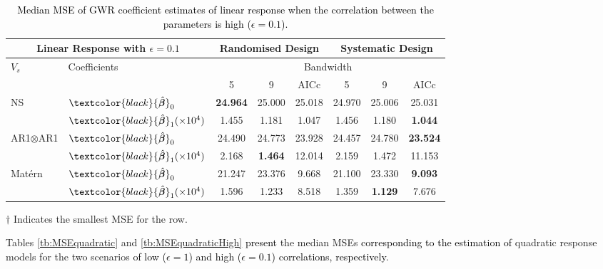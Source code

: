 \documentclass[a4paper]{article} 	%
\newcommand{\Matern}{Mat\'ern }
\newcommand{\revision}[1]{\textcolor{black}{#1}}
\newcommand{\zc}[1]{\textcolor{black}{#1}}
\begin{document}
\begin{table}[!htp]
	\centering
\begin{threeparttable}
\caption{\zc{Median MSE of GWR coefficient estimates of linear response when the correlation between the parameters is high ($\epsilon=0.1$).}}\label{tb:MSElinearHigh}
\begin{tabular}{ll|ccc|ccc}
\toprule
\multicolumn{2}{c}{Linear Response with $\epsilon=0.1$} & \multicolumn{3}{c}{Randomised Design} & \multicolumn{3}{c}{Systematic Design} \\ \midrule
\multirow{2}{*}{$V_s$} & \multirow{2}{*}{Coefficients}  & \multicolumn{6}{c}{Bandwidth}\\ 
&  & 5  & 9  & AICc & 5  & 9  & AICc \\ \midrule
\multirow{2}{*}{NS}   & $\zc{\hat{\bm{\beta}}}_0$ & \bf{24.964}\tnote{$\dagger$}  & 25.000 & 25.018    & 24.970 & 25.006 & 25.031 \\ 
& $\zc{\hat{\bm{\beta}}}_1 (\times 10^4)$ &  1.455  & 1.181  & 1.047     & 1.456  & 1.180  & \bf{1.044}\tnote{$\dagger$}   \\  \midrule
\multirow{2}{*}{AR1$\otimes$AR1}  & $\zc{\hat{\bm{\beta}}}_0$ & 24.490 & 24.773 & 23.928    & 24.457 & 24.780 & \bf{23.524}\tnote{$\dagger$}    \\ 
& $\zc{\hat{\bm{\beta}}}_1 (\times 10^4)$ &  2.168  & \bf{1.464}\tnote{$\dagger$}  & 12.014    & 2.159  & 1.472  & 11.153    \\ \midrule
\multirow{2}{*}{\Matern} & $\zc{\hat{\bm{\beta}}}_0$ & 21.247 & 23.376 & 9.668     & 21.100 & 23.330 & \bf{9.093}\tnote{$\dagger$}  \\ 
& $\zc{\hat{\bm{\beta}}}_1 (\times 10^4)$ & 1.596 & 1.233  & 8.518     & 1.359  & \bf{1.129}\tnote{$\dagger$}  & 7.676 \\
\bottomrule
\end{tabular}
\begin{tablenotes}
\item[$\dagger$] \footnotesize Indicates the smallest MSE for the row.
\end{tablenotes}
\end{threeparttable}
\end{table}

Tables \ref{tb:MSEquadratic} and \ref{tb:MSEquadraticHigh} \revision{present} the median MSEs \revision{corresponding to the estimation of} quadratic response models for the two scenarios \revision{of low ($\epsilon = 1$) and high ($\epsilon = 0.1$) correlations, respectively}. \revision{}
\end{document}
